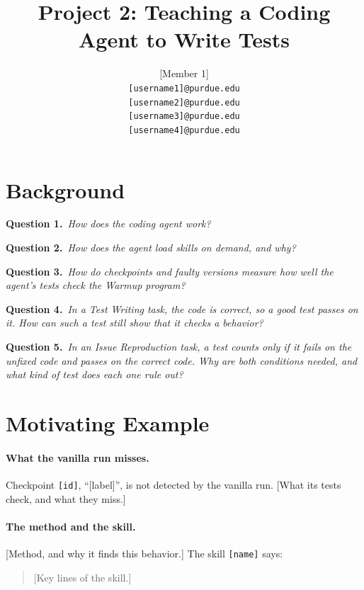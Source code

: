 \documentclass[11pt]{article}
\title{Project 2: Teaching a Coding Agent to Write Tests}
\author{[Member 1] \\
  \texttt{[username1]@purdue.edu}
  \And
  [Member 2] \\
  \texttt{[username2]@purdue.edu}
  \AND
  [Member 3] \\
  \texttt{[username3]@purdue.edu}
  \And
  [Member 4] \\
  \texttt{[username4]@purdue.edu}}
\newcommand{\question}[2]{\par\medskip\noindent\textbf{Question #1.}\ \textit{#2}\par\smallskip\noindent\ignorespaces}
\begin{document}
\maketitle

\section{Background}

\question{1}{How does the coding agent work?}
[Answer.]

\question{2}{How does the agent load skills on demand, and why?}
[Answer.]

\question{3}{How do checkpoints and faulty versions measure how well
the agent's tests check the Warmup program?}
[Answer.]

\question{4}{In a Test Writing task, the code is correct, so a good
test passes on it. How can such a test still show that it checks a behavior?}
[Answer.]

\question{5}{In an Issue Reproduction task, a test counts only if it
fails on the unfixed code and passes on the correct code. Why are both
conditions needed, and what kind of test does each one rule out?}
[Answer.]

\section{Motivating Example}

\paragraph{What the vanilla run misses.}
Checkpoint \texttt{[id]}, ``[label]'', is not detected by the vanilla run.
[What its tests check, and what they miss.]

\paragraph{The method and the skill.}
[Method, and why it finds this behavior.] The skill \texttt{[name]} says:
\begin{quote}\small
[Key lines of the skill.]
\end{quote}
\end{document}
